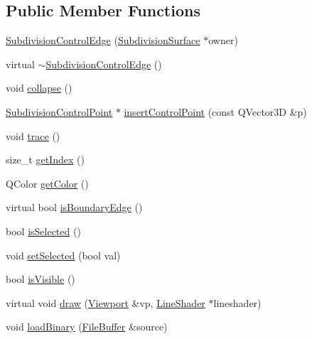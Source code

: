 \subsection*{Public Member Functions}
\begin{DoxyCompactItemize}
\item 
\hyperlink{classShipCAD_1_1SubdivisionControlEdge_aca48edfc1bb45a645708aecc8c8c3e04}{Subdivision\-Control\-Edge} (\hyperlink{classShipCAD_1_1SubdivisionSurface}{Subdivision\-Surface} $\ast$owner)
\item 
virtual \hyperlink{classShipCAD_1_1SubdivisionControlEdge_ad5e8153693c900a598618277cdeccd15}{$\sim$\-Subdivision\-Control\-Edge} ()
\item 
void \hyperlink{classShipCAD_1_1SubdivisionControlEdge_a33fffac08b512f73c0676a5cfa81511d}{collapse} ()
\item 
\hyperlink{classShipCAD_1_1SubdivisionControlPoint}{Subdivision\-Control\-Point} $\ast$ \hyperlink{classShipCAD_1_1SubdivisionControlEdge_a4839a04d67e4240b570fd23be711bc10}{insert\-Control\-Point} (const Q\-Vector3\-D \&p)
\item 
void \hyperlink{classShipCAD_1_1SubdivisionControlEdge_a07c67ddff486dc5e4ad830f549b32099}{trace} ()
\item 
size\-\_\-t \hyperlink{classShipCAD_1_1SubdivisionControlEdge_a0fb224ed7895deb9eb4cdb57ab9c451c}{get\-Index} ()
\item 
Q\-Color \hyperlink{classShipCAD_1_1SubdivisionControlEdge_a5cafa9a1fd8c93f10e2ae767608dfb26}{get\-Color} ()
\item 
virtual bool \hyperlink{classShipCAD_1_1SubdivisionControlEdge_a23adc8ad28860987b7b4866eada3c463}{is\-Boundary\-Edge} ()
\item 
bool \hyperlink{classShipCAD_1_1SubdivisionControlEdge_abcb240992ffb5637363341dbfd7003c7}{is\-Selected} ()
\item 
void \hyperlink{classShipCAD_1_1SubdivisionControlEdge_ae247e08eec97952d1835df03c8269829}{set\-Selected} (bool val)
\item 
bool \hyperlink{classShipCAD_1_1SubdivisionControlEdge_aaf83103b6772bf2387641b09194b12a6}{is\-Visible} ()
\item 
virtual void \hyperlink{classShipCAD_1_1SubdivisionControlEdge_a6b86017a5ea7fe487f6017071406e8c4}{draw} (\hyperlink{classShipCAD_1_1Viewport}{Viewport} \&vp, \hyperlink{classShipCAD_1_1LineShader}{Line\-Shader} $\ast$lineshader)
\item 
void \hyperlink{classShipCAD_1_1SubdivisionControlEdge_a0f48c4ce176a5de42e0a7c741aa129f5}{load\-Binary} (\hyperlink{classShipCAD_1_1FileBuffer}{File\-Buffer} \&source)

\end{DoxyCompactItemize}
